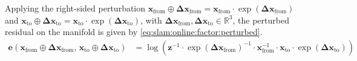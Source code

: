 Applying the right-sided perturbation
$\mathbf{x}_{\mathrm{from}}\oplus\mathbf{\Delta x}_{\mathrm{from}}
= \mathbf{x}_{\mathrm{from}}\cdot\exp(\mathbf{\Delta x}_{\mathrm{from}})$
and $\mathbf{x}_{\mathrm{to}}\oplus\mathbf{\Delta x}_{\mathrm{to}}
= \mathbf{x}_{\mathrm{to}}\cdot\exp(\mathbf{\Delta x}_{\mathrm{to}})$, with
$\mathbf{\Delta x}_{\mathrm{from}},\mathbf{\Delta x}_{\mathrm{to}}\in\mathbb{R}^3$,
the perturbed residual on the manifold is given by
\eqref{eq:slam:online:factor:perturbed}.
\begin{equation}
\label{eq:slam:online:factor:perturbed}
\begin{aligned}
\mathbf{e}\!\left(
  \mathbf{x}_{\mathrm{from}}\oplus\mathbf{\Delta x}_{\mathrm{from}},\,
  \mathbf{x}_{\mathrm{to}}\oplus\mathbf{\Delta x}_{\mathrm{to}}
\right)
& = \log\!\left(\mathbf{z}^{-1}\cdot
                \exp(\mathbf{\Delta x}_{\mathrm{from}})^{-1}\cdot
                \mathbf{x}_{\mathrm{from}}^{-1}\cdot
                \mathbf{x}_{\mathrm{to}}\cdot
                \exp(\mathbf{\Delta x}_{\mathrm{to}})\right)
\end{aligned}
\end{equation}

